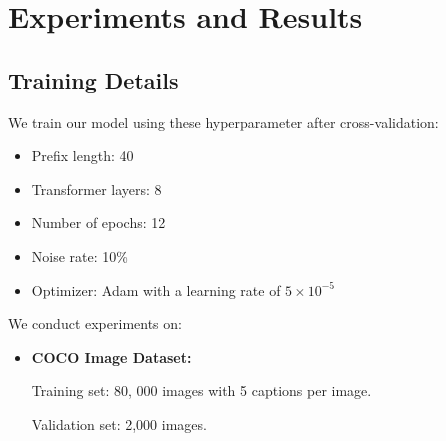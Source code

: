 \documentclass[11pt]{article}
\begin{document}
\section{Experiments and Results}
\subsection{Training Details}
We train our model using these hyperparameter after cross-validation:
\begin{itemize}
  \item Prefix length: 40
  \item Transformer layers: 8
  \item Number of epochs: 12
  \item Noise rate: 10\%
  \item Optimizer: Adam with a learning rate of $5 \times 10^{-5}$
\end{itemize}

We conduct experiments on:
\begin{itemize}
  \item \textbf{COCO Image Dataset:}
  
  Training set: 80, 000 images with 5 captions per image.

  Validation set: 2,000 images.
  
\end{itemize}
\end{document}

